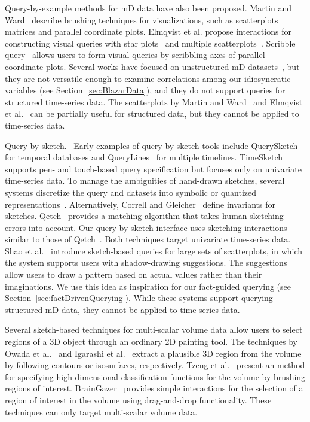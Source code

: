 Query-by-example methods for mD data have also been proposed.
Martin and Ward~\cite{Martin2005} describe brushing techniques for visualizations,
such as scatterplots matrices and parallel coordinate plots.
Elmqvist et al. propose interactions for constructing visual queries with star plots~\cite{Elmqvist2007} and multiple scatterplots~\cite{Elmqvist2008}.
Scribble query~\cite{Nielsen2016} allows users to form visual queries by scribbling axes of parallel coordinate plots.
Several works have focused on unstructured mD datasets~\cite{Martin2005,Elmqvist2007,Nielsen2016}, 
but they are not versatile enough to examine correlations among our idiosyncratic variables (see Section~\ref{sec:BlazarData}), and they do not support queries for structured time-series data.
The scatterplots by Martin and Ward~\cite{Martin2005} and Elmqvist et al.~\cite{Elmqvist2008} can be partially useful for structured data, but they cannot be applied to time-series data.

\textsf{Query-by-sketch.\ } 
Early examples of query-by-sketch tools include QuerySketch~\cite{Wattenberg2001} for temporal databases and QueryLines~\cite{Ryall2005} for multiple timelines. 
TimeSketch~\cite{Eichmann2015} supports pen- and touch-based query specification but focuses only on univariate time-series data.
To manage the ambiguities of hand-drawn sketches, several systems discretize the query and datasets into symbolic or quantized representations~\cite{Muthumanickam2016,ruta2019sax}.
Alternatively, Correll and Gleicher~\cite{Correll2016} define invariants for sketches. 
Qetch~\cite{Mannino2018} provides a matching algorithm that takes human sketching errors into account.
Our query-by-sketch interface uses sketching interactions similar to those of Qetch~\cite{Mannino2018}.
Both techniques target univariate time-series data.
Shao et al.~\cite{Shao2014} introduce sketch-based queries for large sets of scatterplots,
in which the system supports users with shadow-drawing suggestions. 
The suggestions allow users to draw a pattern based on actual values rather than their imaginations.
We use this idea as inspiration for our fact-guided querying (see Section~\ref{sec:factDrivenQuerying}).
While these systems support querying structured mD data, they cannot be applied to time-series data.

Several sketch-based techniques for multi-scalar volume data allow users to select regions of a 3D object through an ordinary 2D painting tool.
The techniques by Owada et al.~\cite{Owada2005} and Igarashi et al.~\cite{Igarashi2016} extract a plausible 3D region from the volume
by following contours or isosurfaces, respectively.
Tzeng et al.~\cite{Tzeng2003} present an method for specifying high-dimensional classification functions for the volume
by brushing regions of interest. 
BrainGazer~\cite{Bruckner2009} provides simple interactions for the selection of a region of interest in the volume
using drag-and-drop functionality.
These techniques can only target multi-scalar volume data. 

